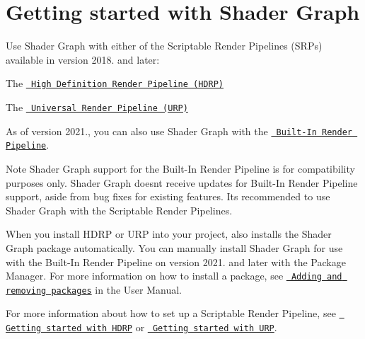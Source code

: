 \chapter{Getting started with Shader Graph}
\hypertarget{md__hey_tea_9_2_library_2_package_cache_2com_8unity_8shadergraph_0d14_80_88_2_documentation_0i_2_getting-_started}{}\label{md__hey_tea_9_2_library_2_package_cache_2com_8unity_8shadergraph_0d14_80_88_2_documentation_0i_2_getting-_started}
\label{md__hey_tea_9_2_library_2_package_cache_2com_8unity_8shadergraph_0d14_80_88_2_documentation_0i_2_getting-_started_autotoc_md3289}%
%
 Use Shader Graph with either of the Scriptable Render Pipelines (SRPs) available in  version 2018. and later\+:


\begin{DoxyItemize}
\item The \href{https://docs.unity3d.com/Packages/com.unity.render-pipelines.high-definition@latest}{\texttt{ High Definition Render Pipeline (HDRP)}}
\item The \href{https://docs.unity3d.com/Packages/com.unity.render-pipelines.universal@latest}{\texttt{ Universal Render Pipeline (URP)}}
\end{DoxyItemize}

As of  version 2021., you can also use Shader Graph with the \href{https://docs.unity3d.com/Documentation/Manual/built-in-render-pipeline.html}{\texttt{ Built-\/\+In Render Pipeline}}.

\begin{DoxyNote}{Note}
Shader Graph support for the Built-\/\+In Render Pipeline is for compatibility purposes only. Shader Graph doesn\textquotesingle{}t receive updates for Built-\/\+In Render Pipeline support, aside from bug fixes for existing features. It\textquotesingle{}s recommended to use Shader Graph with the Scriptable Render Pipelines.
\end{DoxyNote}
When you install HDRP or URP into your project,  also installs the Shader Graph package automatically. You can manually install Shader Graph for use with the Built-\/\+In Render Pipeline on  version 2021. and later with the Package Manager. For more information on how to install a package, see \href{https://docs.unity3d.com/Manual/upm-ui-actions.html}{\texttt{ Adding and removing packages}} in the  User Manual.

For more information about how to set up a Scriptable Render Pipeline, see \href{https://docs.unity3d.com/Packages/com.unity.render-pipelines.high-definition@latest/index.html?subfolder=/manual/Getting-started-with-HDRP.html}{\texttt{ Getting started with HDRP}} or \href{https://docs.unity3d.com/Packages/com.unity.render-pipelines.universal@latest/index.html?subfolder=/manual/InstallingAndConfiguringURP.html}{\texttt{ Getting started with URP}}. 